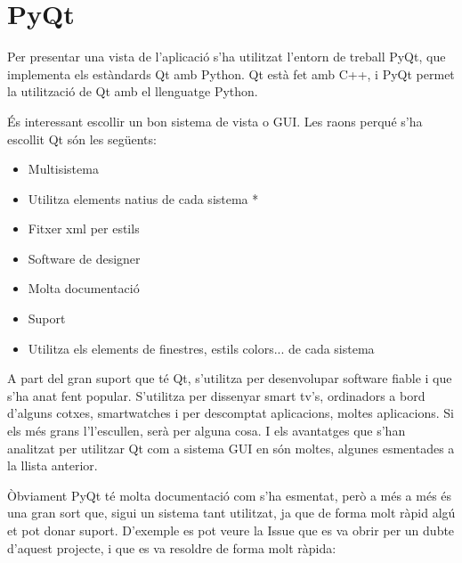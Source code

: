 \documentclass[letterpaper,11pt,catalan]{sphinxmanual}
\begin{document}
\section{PyQt}
\label{\detokenize{index:pyqt}}
Per presentar una vista de l'aplicació s'ha utilitzat l'entorn de treball PyQt, que implementa
els estàndards Qt amb Python.
Qt està fet amb C++, i PyQt permet la utilització de Qt amb el llenguatge Python.

És interessant escollir un bon sistema de vista o GUI. Les raons perqué s'ha escollit Qt són les
següents:
\begin{itemize}
\item {} 
Multisistema

\item {} 
Utilitza elements natius de cada sistema *

\item {} 
Fitxer xml per estils

\item {} 
Software de designer

\item {} 
Molta documentació

\item {} 
Suport

\end{itemize}
\begin{itemize}
\item {} 
Utilitza els elements de finestres, estils colors... de cada sistema

\end{itemize}

A part del gran suport que té Qt, s'utilitza per desenvolupar software fiable i que s'ha
anat fent popular. S'utilitza per dissenyar smart tv's, ordinadors a bord d'alguns
cotxes, smartwatches i per descomptat aplicacions, moltes aplicacions. Si els més grans
l'l'escullen, serà per alguna cosa. I els avantatges que s'han analitzat per utilitzar
Qt com a sistema GUI en són moltes, algunes esmentades a la llista anterior.

Òbviament PyQt té molta documentació com s'ha esmentat, però a més a més és una gran sort que,
sigui un sistema tant utilitzat, ja que de forma molt ràpid algú et pot donar suport. D'exemple
es pot veure la Issue que es va obrir per un dubte d'aquest projecte, i que es va resoldre de
forma molt ràpida:

\end{document}
